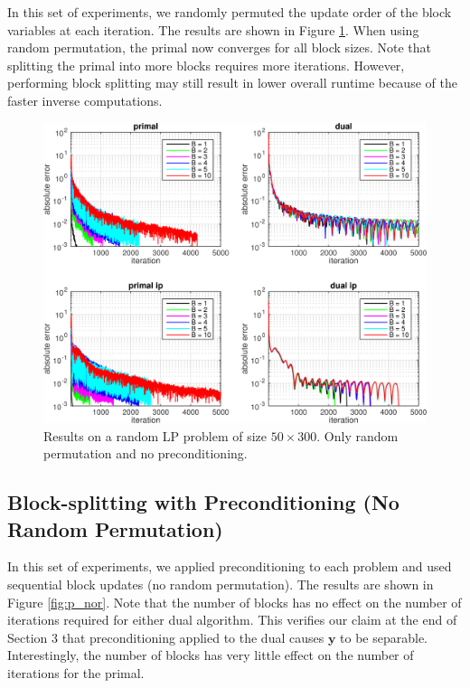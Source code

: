 \documentclass{article}
\begin{document}
{In this set of experiments, we randomly permuted the update order of the block variables at each iteration. The results are shown in Figure \ref{fig:nop_r}. When using random permutation, the primal now converges for all block sizes. Note that splitting the primal into more blocks requires more iterations. However, performing block splitting may still result in lower overall runtime because of the faster inverse computations. 
\newline
\newline
\newline
\newline
\begin{figure}[h]
	\includegraphics[width=\textwidth]{../figures/noprecond_rndperm.png}
	\caption{Results on a random LP problem of size $50 \times 300$. Only random permutation and no preconditioning.}
	\label{fig:nop_r}
\end{figure}
\newpage
\subsection*{Block-splitting with Preconditioning (No Random Permutation)}
In this set of experiments, we applied preconditioning to each problem and used sequential block updates (no random permutation). The results are shown in Figure \ref{fig:p_nor}. Note that the number of blocks has no effect on the number of iterations required for either dual algorithm. This verifies our claim at the end of Section 3 that preconditioning applied to the dual causes $\mathbf{y}$ to be separable. Interestingly, the number of blocks has very little effect on the number of iterations for the primal. 

}
\end{document}
